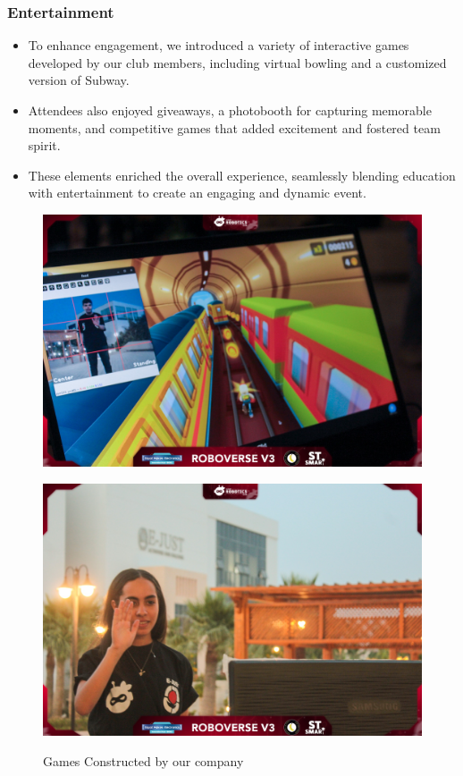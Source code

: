 \documentclass[a4paper,12pt]{article}
\begin{document}
\subsubsection{Entertainment}
\begin{itemize}
    \item To enhance engagement, we introduced a variety of interactive games developed by our club members, including virtual bowling and a customized version of Subway.
    \item Attendees also enjoyed giveaways, a photobooth for capturing memorable moments, and competitive games that added excitement and fostered team spirit.
    \item These elements enriched the overall experience, seamlessly blending education with entertainment to create an engaging and dynamic event.
\end{itemize}
\begin{figure}[h]
    \centering
    \begin{minipage}{0.48\textwidth}
        \centering
        \includegraphics[width=\textwidth]{Entertaining games.jpg}
        
        \label{fig:figure1}
    \end{minipage}
    \hfill
    \begin{minipage}{0.48\textwidth}
        \centering
        \includegraphics[width=\textwidth]{Entertaining two.jpg}
      
        \label{fig:figure2}
    \end{minipage}
    \caption{Games Constructed by our company }
    \label{fig:both_figures}
\end{figure}
\end{document}
